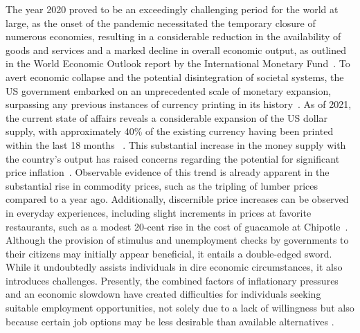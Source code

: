 The year 2020 proved to be an exceedingly challenging period for the world at large, as the onset of the pandemic necessitated the temporary closure of numerous economies, resulting in a considerable reduction in the availability of goods and services and a marked decline in overall economic output, as outlined in the World Economic Outlook report by the International Monetary Fund~\cite{imf2020}. To avert economic collapse and the potential disintegration of societal systems, the US government embarked on an unprecedented scale of monetary expansion, surpassing any previous instances of currency printing in its history~\cite{blinder2020}. As of 2021, the current state of affairs reveals a considerable expansion of the US dollar supply, with approximately 40\% of the existing currency having been printed within the last 18 months ~\cite{fedmoneysupply}. This substantial increase in the money supply with the country's output has raised concerns regarding the potential for significant price inflation~\cite{Blanchard2021}. Observable evidence of this trend is already apparent in the substantial rise in commodity prices, such as the tripling of lumber prices compared to a year ago. Additionally, discernible price increases can be observed in everyday experiences, including slight increments in prices at favorite restaurants, such as a modest 20-cent rise in the cost of guacamole at Chipotle~\cite{BLS}. Although the provision of stimulus and unemployment checks by governments to their citizens may initially appear beneficial, it entails a double-edged sword. While it undoubtedly assists individuals in dire economic circumstances, it also introduces challenges. Presently, the combined factors of inflationary pressures and an economic slowdown have created difficulties for individuals seeking suitable employment opportunities, not
solely due to a lack of willingness but also because certain job options may be less desirable than available alternatives \cite{cbo2020, kahn2020}.

